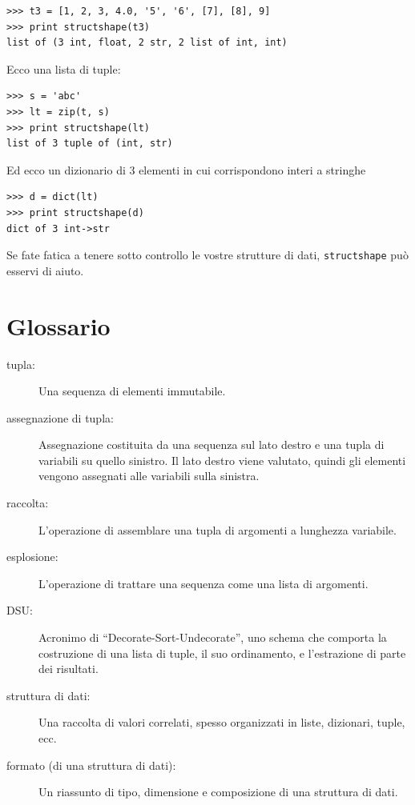 \documentclass[10pt]{book}
\begin{document}
\begin{verbatim}
>>> t3 = [1, 2, 3, 4.0, '5', '6', [7], [8], 9]
>>> print structshape(t3)
list of (3 int, float, 2 str, 2 list of int, int)
\end{verbatim}
%
Ecco una lista di tuple:

\begin{verbatim}
>>> s = 'abc'
>>> lt = zip(t, s)
>>> print structshape(lt)
list of 3 tuple of (int, str)
\end{verbatim}
%
Ed ecco un dizionario di 3 elementi in cui corrispondono interi a stringhe

\begin{verbatim}
>>> d = dict(lt) 
>>> print structshape(d)
dict of 3 int->str
\end{verbatim}
%
Se fate fatica a tenere sotto controllo le vostre strutture di dati,
{\tt structshape} può esservi di aiuto.


\section{Glossario}

\begin{description}

\item[tupla:] Una sequenza di elementi immutabile.

\item[assegnazione di tupla:] Assegnazione costituita da una sequenza sul lato destro e una tupla di variabili su quello sinistro. Il lato destro viene valutato, quindi gli elementi vengono assegnati alle variabili sulla sinistra.

\item[raccolta:] L'operazione di assemblare una tupla di argomenti a lunghezza variabile.

\item[esplosione:] L'operazione di trattare una sequenza come una lista di argomenti.

\item[DSU:] Acronimo di ``Decorate-Sort-Undecorate'', uno schema che comporta la costruzione di una lista di tuple, il suo ordinamento, e l'estrazione di parte dei risultati.

\item[struttura di dati:] Una raccolta di valori correlati, spesso organizzati in liste, dizionari, tuple, ecc.

\item[formato (di una struttura di dati):] Un riassunto di tipo, dimensione e composizione di una struttura di dati.

\end{description}
\end{document}
